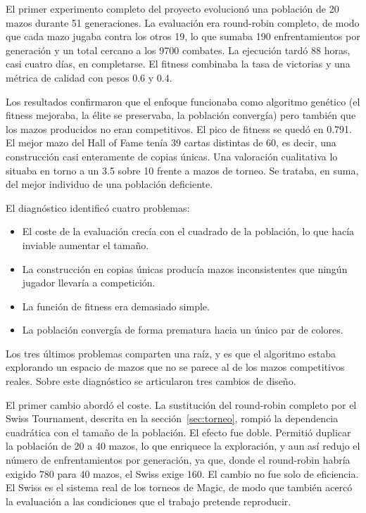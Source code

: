 El primer experimento completo del proyecto evolucionó una población de 20 mazos durante 51 generaciones. La evaluación era round-robin completo, de modo que cada mazo jugaba contra los otros 19, lo que sumaba 190 enfrentamientos por generación y un total cercano a los 9700 combates. La ejecución tardó 88 horas, casi cuatro días, en completarse. El fitness combinaba la tasa de victorias y una métrica de calidad con pesos 0.6 y 0.4.

Los resultados confirmaron que el enfoque funcionaba como algoritmo genético (el fitness mejoraba, la élite se preservaba, la población convergía) pero también que los mazos producidos no eran competitivos. El pico de fitness se quedó en 0.791. El mejor mazo del Hall of Fame tenía 39 cartas distintas de 60, es decir, una construcción casi enteramente de copias únicas. Una valoración cualitativa lo situaba en torno a un 3.5 sobre 10 frente a mazos de torneo. Se trataba, en suma, del mejor individuo de una población deficiente.

El diagnóstico identificó cuatro problemas:

\begin{itemize}
    \item El coste de la evaluación crecía con el cuadrado de la población, lo que hacía inviable aumentar el tamaño.
    \item La construcción en copias únicas producía mazos inconsistentes que ningún jugador llevaría a competición.
    \item La función de fitness era demasiado simple.
    \item La población convergía de forma prematura hacia un único par de colores.
\end{itemize}

Los tres últimos problemas comparten una raíz, y es que el algoritmo estaba explorando un espacio de mazos que no se parece al de los mazos competitivos reales. Sobre este diagnóstico se articularon tres cambios de diseño.

El primer cambio abordó el coste. La sustitución del round-robin completo por el Swiss Tournament, descrita en la sección~\ref{sec:torneo}, rompió la dependencia cuadrática con el tamaño de la población. El efecto fue doble. Permitió duplicar la población de 20 a 40 mazos, lo que enriquece la exploración, y aun así redujo el número de enfrentamientos por generación, ya que, donde el round-robin habría exigido 780 para 40 mazos, el Swiss exige 160. El cambio no fue solo de eficiencia. El Swiss es el sistema real de los torneos de Magic, de modo que también acercó la evaluación a las condiciones que el trabajo pretende reproducir.

